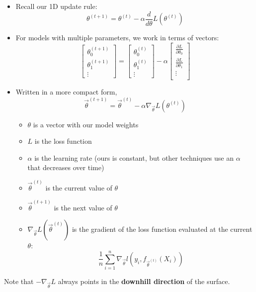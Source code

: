 \documentclass[
  letterpaper,
  DIV=11,
  numbers=noendperiod]{scrreprt}
\providecommand{\tightlist}{%
  \setlength{\itemsep}{0pt}\setlength{\parskip}{0pt}}\usepackage{longtable,booktabs,array}
\begin{document}
\begin{itemize}
\item
  Recall our 1D update rule:
  \[\theta^{(t+1)} = \theta^{(t)} - \alpha \frac{d}{d\theta}L(\theta^{(t)})\]
\item
  For models with multiple parameters, we work in terms of vectors:
  \[\begin{bmatrix}
           \theta_{0}^{(t+1)} \\
           \theta_{1}^{(t+1)} \\
           \vdots
         \end{bmatrix} = \begin{bmatrix}
           \theta_{0}^{(t)} \\
           \theta_{1}^{(t)} \\
           \vdots
         \end{bmatrix} - \alpha \begin{bmatrix}
           \frac{\partial L}{\partial \theta_{0}} \\
           \frac{\partial L}{\partial \theta_{1}} \\
           \vdots \\
         \end{bmatrix}\]
\item
  Written in a more compact form,
  \[\vec{\theta}^{(t+1)} = \vec{\theta}^{(t)} - \alpha \nabla_{\vec{\theta}} L(\theta^{(t)}) \]

  \begin{itemize}
  \tightlist
  \item
    \(\theta\) is a vector with our model weights
  \item
    \(L\) is the loss function
  \item
    \(\alpha\) is the learning rate (ours is constant, but other
    techniques use an \(\alpha\) that decreases over time)
  \item
    \(\vec{\theta}^{(t)}\) is the current value of \(\theta\)
  \item
    \(\vec{\theta}^{(t+1)}\) is the next value of \(\theta\)
  \item
    \(\nabla_{\vec{\theta}} L(\vec{\theta}^{(t)})\) is the gradient of
    the loss function evaluated at the current \(\theta\):
    \[\frac{1}{n}\sum_{i=1}^{n}\nabla_{\vec{\theta}} l(y_i, f_{\vec{\theta}^{(t)}}(X_i))\]
  \end{itemize}
\end{itemize}

Note that \(-\nabla_{\vec{\theta}} L\) always points in the
\textbf{downhill direction} of the surface.
\end{document}
